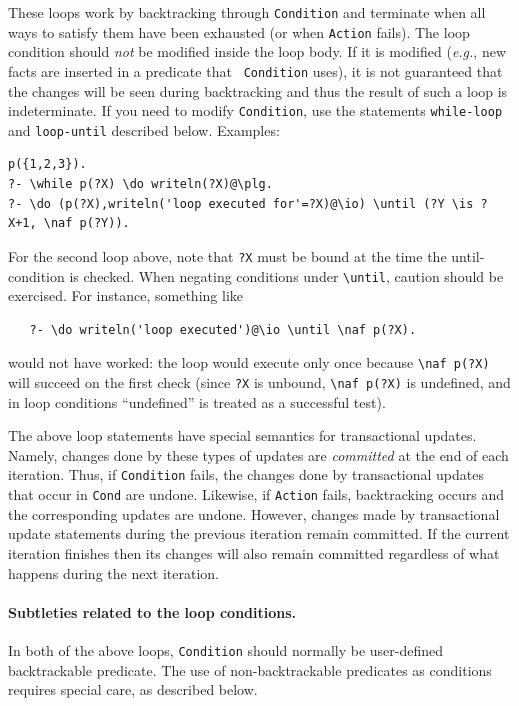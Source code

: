 \documentclass[11pt]{article}
\newcommand{\bs}{\textbackslash}
\newcommand{\RULELOGNAF}{{\texttt{{\bs}naf}}\xspace}
\begin{document}
These loops work by backtracking through {\tt Condition} and terminate when
all ways to satisfy them have been exhausted (or when {\tt Action} fails).
The loop condition should \emph{not} be modified inside the loop body.  If
it is modified ({\it e.g.}, new facts are inserted in a predicate that {\tt
  Condition} uses), it is not guaranteed that the changes will be seen
during backtracking and thus the result of such a loop is indeterminate.
If you need to modify {\tt Condition}, use the statements {\tt while-loop}
and {\tt loop-until} described below. Examples:
\begin{verbatim}
p({1,2,3}).
?- \while p(?X) \do writeln(?X)@\plg.
?- \do (p(?X),writeln('loop executed for'=?X)@\io) \until (?Y \is ?X+1, \naf p(?Y)).
\end{verbatim}
For the second loop above, note that \texttt{?X} must be bound at the time
the until-condition is checked. When negating conditions under
\texttt{\bs{}until}, caution should be exercised. For instance, something like
\begin{verbatim}
   ?- \do writeln('loop executed')@\io \until \naf p(?X).
\end{verbatim}
would not have worked: the loop would execute only once because
\texttt{\RULELOGNAF p(?X)} will succeed on the first check (since
\texttt{?X} is unbound, \texttt{\RULELOGNAF p(?X)} is undefined, and in
loop conditions ``undefined'' is treated as a successful test).   

The above loop statements have special semantics for transactional updates.
Namely, changes done by these types of updates are \emph{committed} at the
end of each iteration. Thus, if {\tt Condition} fails, the changes done by
transactional updates that occur in {\tt Cond} are undone. Likewise, if
{\tt Action} fails, backtracking occurs and the corresponding updates are
undone. However, changes made by transactional update statements during the
previous iteration remain committed. If the current iteration finishes then
its changes will also remain committed regardless of what happens during
the next iteration.

\paragraph{Subtleties related to the loop conditions.}
In both of the above loops, \texttt{Condition} should normally be
user-defined backtrackable predicate. The use of
non-backtrackable predicates as conditions
requires special care, as described below.
\end{document}
